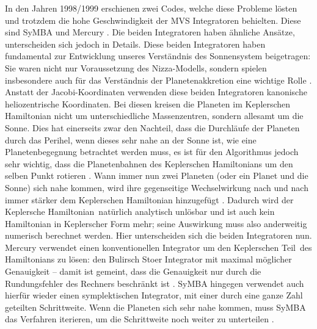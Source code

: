 \documentclass[12pt,a4paper,twoside,open=right,bibliography=totoc]{scrbook}
\renewcommand{\cite}{ \citep}
\begin{document}
In den Jahren 1998/1999 erschienen zwei Codes, welche diese Probleme lösten und trotzdem die hohe Geschwindigkeit der MVS Integratoren behielten. Diese sind SyMBA \cite{Duncan1998} und Mercury\cite{Chambers1999}. Die beiden Integratoren haben ähnliche Ansätze, unterscheiden sich jedoch in Details. Diese beiden Integratoren haben fundamental zur Entwicklung unseres Verständnis des Sonnensystem beigetragen: Sie waren nicht nur Voraussetzung des Nizza-Modells, sondern spielen insbesondere auch für das Verständnis der Planetenakkretion eine wichtige Rolle\cite{Morbidelli2002}.
Anstatt der Jacobi-Koordinaten verwenden diese beiden Integratoren kanonische heliozentrische Koordinaten. Bei diesen kreisen die Planeten im Keplerschen Hamiltonian nicht um unterschiedliche Massenzentren, sondern allesamt um die Sonne. Dies hat einerseits zwar den Nachteil, dass die Durchläufe der Planeten durch das Perihel, wenn dieses sehr nahe an der Sonne ist, wie eine Planetenbegegnung betrachtet werden muss, es ist für den Algorithmus jedoch sehr wichtig, dass die Planetenbahnen des Keplerschen Hamiltonians um den selben Punkt rotieren\cite{Morbidelli2002}.
Wann immer nun zwei Planeten (oder ein Planet und die Sonne) sich nahe kommen, wird ihre gegenseitige Wechselwirkung nach und nach immer stärker dem Keplerschen Hamiltonian hinzugefügt\cite{Morbidelli2002}.
Dadurch wird der \glqq Keplersche Hamiltonian\grqq\  natürlich analytisch unlösbar und ist auch kein Hamiltonian in Keplerscher Form mehr; seine Auswirkung muss also anderweitig numerisch berechnet werden.
Hier unterscheiden sich die beiden Integratoren nun. Mercury verwendet einen konventionellen Integrator um den \glqq Keplerschen Teil\grqq\  des Hamiltonians zu lösen: den Bulirsch Stoer Integrator mit maximal möglicher Genauigkeit – damit ist gemeint, dass die Genauigkeit nur durch die Rundungsfehler des Rechners beschränkt ist\cite{Chambers1999,Morbidelli2002}.
SyMBA hingegen verwendet auch hierfür wieder einen symplektischen Integrator, mit einer durch eine ganze Zahl geteilten Schrittweite. Wenn die Planeten sich sehr nahe kommen, muss SyMBA das Verfahren iterieren, um die Schrittweite noch weiter zu unterteilen\cite{Duncan1998,Morbidelli2002}.

\FloatBarrier
\end{document}
